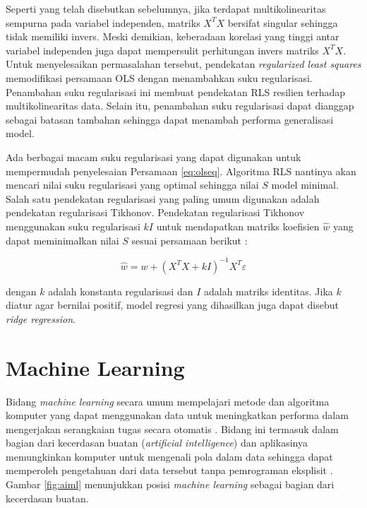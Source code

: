 Seperti yang telah disebutkan sebelumnya, jika terdapat multikolinearitas
sempurna pada variabel independen, matriks $X^T X$ bersifat singular sehingga
tidak memiliki invers. Meski demikian, keberadaan korelasi yang tinggi antar
variabel independen juga dapat mempersulit perhitungan invers matriks $X^T X$.
Untuk menyelesaikan permasalahan tersebut, pendekatan \textit{regularized least
squares} memodifikasi persamaan OLS dengan menambahkan suku regularisasi.
Penambahan suku regularisasi ini membuat pendekatan RLS resilien terhadap
multikolinearitas data. Selain itu, penambahan suku regularisasi dapat dianggap
sebagai batasan tambahan sehingga dapat menambah performa generalisasi model.

Ada berbagai macam suku regularisasi yang dapat digunakan untuk mempermudah
penyelesaian Persamaan \ref{eq:olseq}. Algoritma RLS nantinya akan mencari
nilai suku regularisasi yang optimal sehingga nilai $S$ model minimal. Salah
satu pendekatan regularisasi yang paling umum digunakan adalah pendekatan
regularisasi Tikhonov. Pendekatan regularisasi Tikhonov menggunakan suku
regularisasi $kI$ untuk mendapatkan matriks koefisien $\hat{w}$ yang dapat
meminimalkan nilai $S$ sesuai persamaan berikut \cite{saleh2019}:

\begin{equation}
\label{eq:rlseq}
	\hat{w} = w + \left( X^T X + kI \right)^{-1} X^T\varepsilon
\end{equation}

dengan $k$ adalah konstanta regularisasi dan $I$ adalah matriks identitas. Jika
$k$ diatur agar bernilai positif, model regresi yang dihasilkan juga dapat
disebut \textit{ridge regression}.

\section{Machine Learning}

Bidang \textit{machine learning} secara umum mempelajari metode dan algoritma
komputer yang dapat menggunakan data untuk meningkatkan performa dalam
mengerjakan serangkaian tugas secara otomatis \cite{mitchell1997}. Bidang ini
termasuk dalam bagian dari kecerdasan buatan (\textit{artificial intelligence})
dan aplikasinya memungkinkan komputer untuk mengenali pola dalam data sehingga
dapat memperoleh pengetahuan dari data tersebut tanpa pemrograman eksplisit
\cite{v2020}. Gambar \ref{fig:aiml} menunjukkan posisi \textit{machine learning}
sebagai bagian dari kecerdasan buatan.

